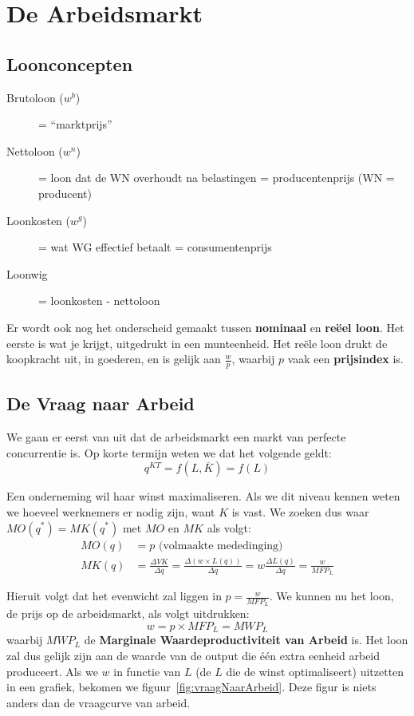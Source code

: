 \section{De Arbeidsmarkt}
\subsection{Loonconcepten}
\begin{description}
   \item[Brutoloon ($w^b$)] = ``marktprijs''
   \item[Nettoloon ($w^n$)] = loon dat de WN overhoudt na belastingen = producentenprijs (WN = producent)
   \item[Loonkosten ($w^g$)] = wat WG effectief betaalt = consumentenprijs
   \item[Loonwig] = loonkosten - nettoloon
\end{description}

Er wordt ook nog het onderscheid gemaakt tussen \textbf{nominaal} en \textbf{re\"eel loon}. Het eerste is wat je krijgt, uitgedrukt in een munteenheid. Het re\"ele loon drukt de koopkracht uit, in goederen, en is gelijk aan $\frac{w}{p}$, waarbij $p$ vaak een \textbf{prijsindex} is.

\subsection{De Vraag naar Arbeid}

We gaan er eerst van uit dat de arbeidsmarkt een markt van perfecte concurrentie is. Op korte termijn weten we dat het volgende geldt:
\begin{equation}
   q^{KT} = f(L,\overline{K}) = f(L)
\end{equation}

Een onderneming wil haar winst maximaliseren. Als we dit niveau kennen weten we hoeveel werknemers er nodig zijn, want $K$ is vast. We zoeken dus waar $MO(q^*) = MK(q^*)$ met $MO$ en $MK$ als volgt:
\begin{align}
   MO(q) &= p \text{ (volmaakte mededinging)}\\
   MK(q) &= \frac{\Delta VK}{\Delta q} = \frac{\Delta (w \times L(q))}{\Delta q} = w \frac{\Delta L(q)}{\Delta q} = \frac{w}{MFP_L}
\end{align}

Hieruit volgt dat het evenwicht zal liggen in $p = \frac{w}{MFP_L}$. We kunnen nu het loon, de prijs op de arbeidsmarkt, als volgt uitdrukken:
\begin{equation}
   w = p \times MFP_L = MWP_L
\end{equation}
waarbij $MWP_L$ de \textbf{Marginale Waardeproductiviteit van Arbeid} is. Het loon zal dus gelijk zijn aan de waarde van de output die \'e\'en extra eenheid arbeid produceert. Als we $w$ in functie van $L$ (de $L$ die de winst optimaliseert) uitzetten in een grafiek, bekomen we figuur~\ref{fig:vraagNaarArbeid}. Deze figur is niets anders dan de vraagcurve van arbeid.

